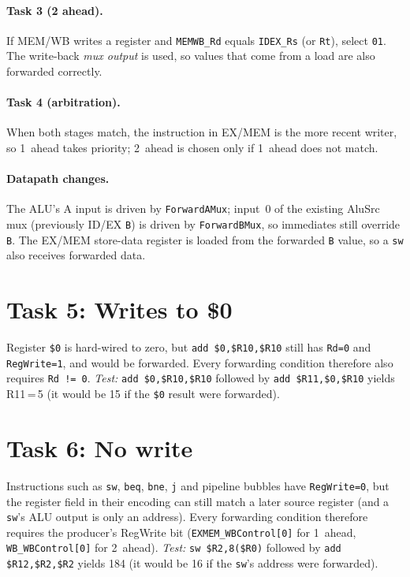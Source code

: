 \documentclass[11pt,letterpaper]{article}
\newcommand{\code}[1]{\texttt{#1}}
\begin{document}
\paragraph{Task 3 (2 ahead).} If MEM/WB writes a register and \code{MEMWB\_Rd} equals \code{IDEX\_Rs} (or \code{Rt}), select \code{01}. The write-back \emph{mux output} is used, so values that come from a load are also forwarded correctly.
\paragraph{Task 4 (arbitration).} When both stages match, the instruction in EX/MEM is the more recent writer, so 1~ahead takes priority; 2~ahead is chosen only if 1~ahead does not match.

\paragraph{Datapath changes.} The ALU's A input is driven by \code{ForwardAMux}; input~0 of the existing AluSrc mux (previously ID/EX \code{B}) is driven by \code{ForwardBMux}, so immediates still override \code{B}. The EX/MEM store-data register is loaded from the forwarded \code{B} value, so a \code{sw} also receives forwarded data.

\section{Task 5: Writes to \texorpdfstring{\$0}{\$0}}
Register \code{\$0} is hard-wired to zero, but \code{add \$0,\$R10,\$R10} still has \code{Rd=0} and \code{RegWrite=1}, and would be forwarded. Every forwarding condition therefore also requires \code{Rd != 0}. \emph{Test:} \code{add \$0,\$R10,\$R10} followed by \code{add \$R11,\$0,\$R10} yields R11\,=\,5 (it would be 15 if the \code{\$0} result were forwarded).

\section{Task 6: No write}
Instructions such as \code{sw}, \code{beq}, \code{bne}, \code{j} and pipeline bubbles have \code{RegWrite=0}, but the register field in their encoding can still match a later source register (and a \code{sw}'s ALU output is only an address). Every forwarding condition therefore requires the producer's RegWrite bit (\code{EXMEM\_WBControl[0]} for 1~ahead, \code{WB\_WBControl[0]} for 2~ahead). \emph{Test:} \code{sw \$R2,8(\$R0)} followed by \code{add \$R12,\$R2,\$R2} yields 184 (it would be 16 if the \code{sw}'s address were forwarded).
\end{document}
